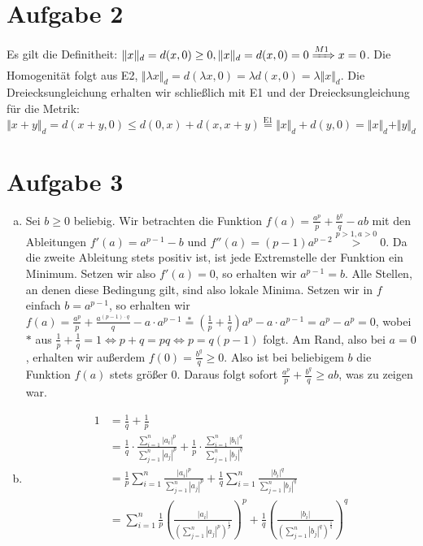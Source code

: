 \documentclass{article}
\theoremstyle{definition}
\newcommand{\equals}{\Longleftrightarrow}
\begin{document}
\section*{Aufgabe 2}
Es gilt die Definitheit: $\Vert x \Vert_d =  d(x,0) \geq 0, \Vert x \Vert_d = d(x,0) = 0 \xRightarrow{M1} x = 0$.
Die Homogenität folgt aus E2, $\Vert \lambda x\Vert_d = d(\lambda x, 0) = \lambda d(x,0) = \lambda \Vert x\Vert_d$.
Die Dreiecksungleichung erhalten wir schließlich mit E1 und der Dreiecksungleichung für die Metrik: 
$$\Vert x + y \Vert_d = d(x+y, 0) \leq d(0, x) + d(x, x+y) \overset{\text{E1}}{=} \Vert x \Vert_d + d(y,0) = \Vert x\Vert_d + \Vert y\Vert_d$$
\section*{Aufgabe 3}
\begin{enumerate}[(a)]
	\item Sei $b \geq 0$ beliebig. Wir betrachten die Funktion $f(a) = \frac{a^p}{p} + \frac{b^q}{q} -ab$ mit den Ableitungen $f'(a) = a^{p-1} - b$ und $f''(a) = (p-1)a^{p-2} \overset{p>1, a >0}{>} 0$. Da die zweite Ableitung stets positiv ist, ist jede Extremstelle der Funktion ein Minimum. Setzen wir also $f'(a) = 0$, so erhalten wir $a^{p-1} = b$. Alle Stellen, an denen diese Bedingung gilt, sind also lokale Minima. Setzen wir in $f$ einfach $b = a^{p-1}$, so erhalten wir $f(a) = \frac{a^p}{p} + \frac{a^{(p-1)\cdot q}}{q} - a\cdot a^{p-1} \overset{*}{=} \left(\frac{1}{p} + \frac{1}{q}\right)a^p - a\cdot a^{p-1} = a^p - a^p = 0$, wobei $*$ aus $\frac{1}{p} + \frac{1}{q} = 1\equals p + q = pq \equals p = q (p-1)$ folgt. Am Rand, also bei $a = 0$, erhalten wir außerdem $f(0) = \frac{b^q}{q} \geq 0$. Also ist bei beliebigem $b$ die Funktion $f(a)$ stets größer 0. Daraus folgt sofort $\frac{a^p}{p} + \frac{b^q}{q} \geq ab$, was zu zeigen war.
	\item \begin{align*}
		1 &= \frac{1}{q} + \frac{1}{p}\\
		&= \frac{1}{q} \cdot \frac{\sum_{i = 1}^{n}|a_i|^p}{\sum_{j = 1}^{n}|a_j|^p} + \frac{1}{p}\cdot \frac{\sum_{i = 1}^{n}|b_i|^q}{\sum_{j = 1}^{n}|b_j|^q}\\
		&= \frac{1}{p} \sum_{i = 1}^{n} \frac{|a_i|^p}{\sum_{j = 1}^{n}|a_j|^p} + \frac{1}{q}\sum_{i = 1}^{n} \frac{|b_i|^q}{\sum_{j = 1}^{n}|b_j|^q}\\
		&= \sum_{i = 1}^{n} \frac{1}{p} \left(\frac{|a_i|}{\left(\sum_{j = 1}^{n}|a_j|^p\right)^\frac{1}{p}}\right)^p + \frac{1}{q} \left(\frac{|b_i|}{\left(\sum_{j = 1}^{n}|b_j|^q\right)^\frac{1}{q}}\right)^q\\

\end{align*}
\end{enumerate}
\end{document}

